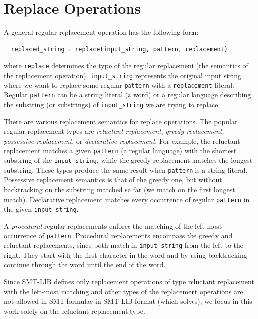 \section{Replace Operations}
A general regular replacement operation has the following form:
\begin{center}
\begin{verbatim}
  replaced_string = replace(input_string, pattern, replacement)
\end{verbatim}
\end{center}
where \texttt{replace} determines the type of the regular replacement (the semantics of the replacement operation).
\texttt{input\_string} represents the original input string where we want to replace some regular \texttt{pattern} with a \texttt{replacement} literal.
Regular \texttt{pattern} can be a string literal (a word) or a regular language describing the substring (or substrings) of \texttt{input\_string} we are trying to replace.

There are various replacement semantics for replace operations. The popular regular replacement types are \emph{reluctant replacement}, \emph{greedy replacement}, \emph{possessive replacement}, or \emph{declarative replacement}.
For example, the reluctant replacement matches a given \texttt{pattern} (a regular language) with the shortest substring of the \texttt{input\_string}, while the greedy replacement matches the longest substring. These types produce the same result when \texttt{pattern} is a string literal.
Possessive replacement semantics is that of the greedy one, but without backtracking on the substring matched so far (we match on the first longest match).
Declarative replacement matches every occurrence of regular \texttt{pattern} in the given \texttt{input\_string}.

A \emph{procedural} regular replacements enforce the matching of the left-most occurrence of \texttt{pattern}.
Procedural replacements encompass the greedy and reluctant replacements, since both match in \texttt{input\_string} from the left to the right.
They start with the first character in the word and by using backtracking continue through the word until the end of the word.

Since SMT-LIB defines only replacement operations of type reluctant replacement with the left-most matching and other types of the replacement operations are not allowed in SMT formulae in SMT-LIB format (which \noodler solves), we focus in this work solely on the reluctant replacement type.

